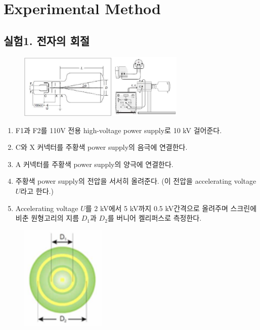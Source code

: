 \documentclass[a4paper, 10pt, nanum]{CSUniSchoolLabReport}
\begin{document}
\section{Experimental Method}

\subsection*{실험1. 전자의 회절}

	\begin{figure}[ht!]
		\centering
		\includegraphics[width=8cm]{Figures/experimental_exam.png}
		\caption{}
		\label{fig:experimental_exam}
	\end{figure}
	\begin{enumerate}[label=\arabic*.]
		\item F1과 F2를 110V 전용 high-voltage power supply로 10 kV 걸어준다.
		\item C와 X 커넥터를 주황색 power supply의 음극에 연결한다.
		\item A 커넥터를 주황색 power supply의 양극에 연결한다.
		\item 주황색 power supply의 전압을 서서히 올려준다. (이 전압을 accelerating voltage $U$라고 한다.)
		\item Accelerating voltage $U$를 2 kV에서 5 kV까지 0.5 kV간격으로 올려주며 스크린에 비춘 원형고리의 지름 $D_1$과 $D_2$를 버니어 켈리퍼스로 측정한다.
	\end{enumerate}
	\begin{figure}[ht!]
		\centering
		\includegraphics[height=5cm]{Figures/experimental_exam2.png}
		\caption{}
		\label{fig:experimental_exam2}
	\end{figure}
\end{document}
